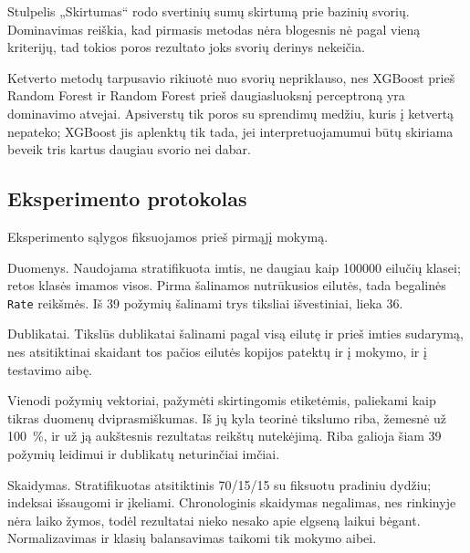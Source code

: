 \begin{table}[H]
\centering
\caption{Jautrumo analizė: kada rikiuotė apsiverstų}
\label{tab:jautrumas}

\vspace{2pt}
\raggedright\footnotesize
Stulpelis „Skirtumas“ rodo svertinių sumų skirtumą prie bazinių svorių.
Dominavimas reiškia, kad pirmasis metodas nėra blogesnis nė pagal
vieną kriterijų, tad tokios poros rezultato joks svorių derinys
nekeičia.
\normalsize
\end{table}

Ketverto metodų tarpusavio rikiuotė nuo svorių nepriklauso, nes
XGBoost prieš Random Forest ir Random Forest prieš daugiasluoksnį
perceptroną yra dominavimo atvejai. Apsiverstų tik poros su sprendimų
medžiu, kuris į ketvertą nepateko; XGBoost jis aplenktų tik tada, jei
interpretuojamumui būtų skiriama beveik tris kartus daugiau svorio nei
dabar.

\subsection{Eksperimento protokolas}
\label{sec:protokolas}


Eksperimento sąlygos fiksuojamos prieš pirmąjį mokymą.

Duomenys. Naudojama stratifikuota imtis, ne daugiau kaip
\num{100000} eilučių klasei; retos klasės imamos visos. Pirma šalinamos
nutrūkusios eilutės, tada begalinės \texttt{Rate} reikšmės. Iš 39
požymių šalinami trys tiksliai išvestiniai, lieka 36.

Dublikatai. Tikslūs dublikatai šalinami pagal visą eilutę ir prieš
imties sudarymą, nes atsitiktinai skaidant tos pačios eilutės kopijos
patektų ir į mokymo, ir į testavimo aibę.

Vienodi požymių vektoriai, pažymėti skirtingomis etiketėmis, paliekami
kaip tikras duomenų dviprasmiškumas. Iš jų kyla teorinė tikslumo riba,
žemesnė už 100~\%, ir už ją aukštesnis rezultatas reikštų nutekėjimą.
Riba galioja šiam 39 požymių leidimui ir dublikatų neturinčiai imčiai.

Skaidymas. Stratifikuotas atsitiktinis \num{70}/\num{15}/\num{15} su
fiksuotu pradiniu dydžiu; indeksai išsaugomi ir įkeliami. Chronologinis
skaidymas negalimas, nes rinkinyje nėra laiko žymos, todėl rezultatai
nieko nesako apie elgseną laikui bėgant. Normalizavimas ir klasių
balansavimas taikomi tik mokymo aibei.

